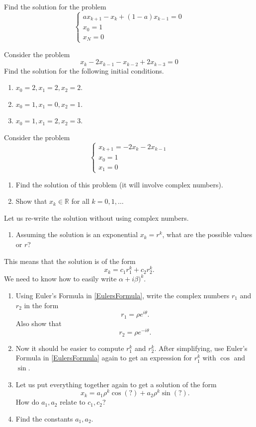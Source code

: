 \begin{exercises}
\begin{problist}
	\prob Find the solution for the problem
	$$ 	\begin{cases}
			 a x_{k+1} - x_k + (1-a) x_{k-1} = 0 \\
			 x_0 = 1 \\
			 x_N = 0
 		\end{cases} $$
	
	
	\prob Consider the problem
	$$ 	x_{k} - 2x_{k-1}  - x_{k-2} + 2 x_{k-3} = 0 $$
	Find the solution for the following initial conditions.
	\begin{enumerate}
		\item $x_0 = 2, x_1 = 2,	 x_2 = 2$.
		\item $x_0 = 1, x_1 = 0,	 x_2 = 1$.
		\item $x_0 = 1, x_1 = 2,	 x_2 = 3$.
	\end{enumerate}
	
	\prob Consider the problem
	$$ 	\begin{cases}
			 x_{k+1} = -2x_{k} - 2x_{k-1} \\
			 x_0 = 1 \\
			 x_1 = 0 
 		\end{cases} $$
 	\begin{enumerate}
 		\item Find the solution of this problem (it will involve complex numbers).
 		\item Show that $x_k \in \mathbb{R}$ for all $k=0,1,\ldots$
	\end{enumerate}
 	Let us re-write the solution without using complex numbers.
 	\begin{enumerate}[resume]
 		\item Assuming the solution is an exponential $x_k=r^k$, what are the possible values or $r$?
	\end{enumerate}
	This means that the solution is of the form
 		$$ x_k = c_1 r_1^k + c_2 r_2^k.$$
 	We need to know how to easily write $\alpha + i \beta)^k$.
 	\begin{enumerate}[resume]
 		\item Using Euler's Formula in \ref{EulersFormula}, write the complex numbers $r_1$ and $r_2$ in the form
			$$ r_1 = \rho e^{i \theta}.$$
			Also show that 
			$$ r_2 = \rho e^{-i \theta}.$$
		\item Now it should be easier to compute $r_1^k$ and $r_2^k$. After simplifying, use Euler's Formula in \ref{EulersFormula} again to get an expression for $r_1^k$ with $\cos$ and $\sin$.
		\item Let us put everything together again to get a solution of the form
		$$ x_k = a_1 \rho^k \cos(?) + a_2 \rho^k \sin(?).$$
		How do $a_1, a_2$ relate to $c_1,c_2$?
		\item Find the constants $a_1,a_2$.
 	\end{enumerate}
	
	
	\end{problist}
\end{exercises}

